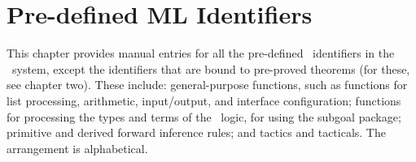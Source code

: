 \chapter{Pre-defined ML Identifiers}

This chapter provides manual entries for all the pre-defined \ML\ identifiers
in the \HOL\ system, except the identifiers that are bound to pre-proved
theorems (for these, see chapter two).  These include: general-purpose
functions, such as functions for list processing, arithmetic, input/output, and
interface configuration; functions for processing the types and terms of the
\HOL\ logic, for using the subgoal package; primitive and derived forward
inference rules; and tactics and tacticals.  The arrangement is alphabetical.
